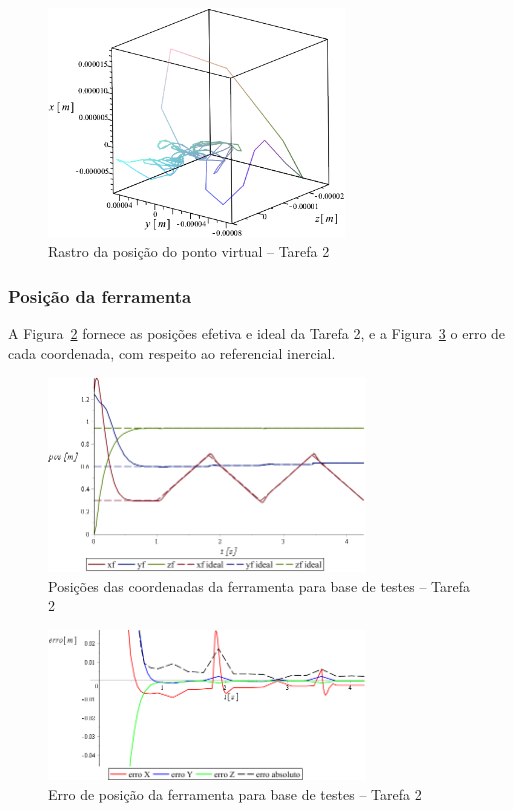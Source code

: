 \begin{figure}[h!]
	\centering 
 	\includegraphics[width=0.70\textwidth]{figs/t2_pvirtural_base_testes}
 	\caption{Rastro da posição do ponto virtual -- Tarefa 2}
 	\label{fig::t2_pvirtural_base_testes}
\end{figure}


\subsubsection{Posição da ferramenta}

A Figura~\ref{fig::t2_posf_base_testes} fornece as posições efetiva e ideal da
Tarefa 2, e a Figura~\ref{fig::t2_erroposf_base_testes} o erro de cada
coordenada, com respeito ao referencial inercial.

\begin{figure}[h!]
	\centering 
 	\includegraphics[width=0.75\textwidth]{figs/t2_posf_base_testes}
 	\caption{Posições das coordenadas da ferramenta para base de testes -- Tarefa
 	2}
 	\label{fig::t2_posf_base_testes}
\end{figure}

\begin{figure}[h!]
	\centering 
 	\includegraphics[width=0.75\textwidth]{figs/t2_erroposf_base_testes}
 	\caption{Erro de posição da ferramenta para base de testes -- Tarefa 2}
 	\label{fig::t2_erroposf_base_testes}
\end{figure}


